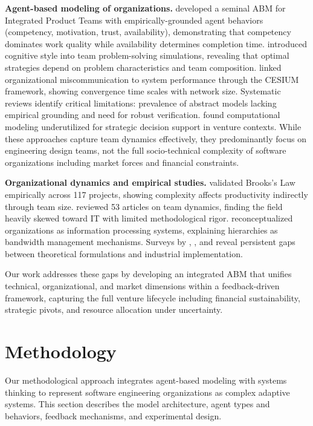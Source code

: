 \documentclass[alpha-refs]{wiley-article}
\begin{document}
\textbf{Agent-based modeling of organizations.} \citet{crowder2012development} developed a seminal ABM for Integrated Product Teams with empirically-grounded agent behaviors (competency, motivation, trust, availability), demonstrating that competency dominates work quality while availability determines completion time. \citet{lapp2019kaboom} introduced cognitive style into team problem-solving simulations, revealing that optimal strategies depend on problem characteristics and team composition. \citet{meluso2019agent, meluso2022review} linked organizational miscommunication to system performance through the CESIUM framework, showing convergence time scales with network size. Systematic reviews \cite{sandria2024agent, negahban2014agent} identify critical limitations: prevalence of abstract models lacking empirical grounding and need for robust verification. \citet{zali2014system} found computational modeling underutilized for strategic decision support in venture contexts. While these approaches capture team dynamics effectively, they predominantly focus on engineering design teams, not the full socio-technical complexity of software organizations including market forces and financial constraints.

\textbf{Organizational dynamics and empirical studies.} \citet{blackburn2006brooks} validated Brooks's Law empirically across 117 projects, showing complexity affects productivity indirectly through team size. \citet{hindiyeh2023systematic} reviewed 53 articles on team dynamics, finding the field heavily skewed toward IT with limited methodological rigor. \citet{petkov2008information} reconceptualized organizations as information processing systems, explaining hierarchies as bandwidth management mechanisms. Surveys by \citet{fan2004modeling}, \citet{wynn2018process}, and \citet{costa2020team} reveal persistent gaps between theoretical formulations and industrial implementation.

Our work addresses these gaps by developing an integrated ABM that unifies technical, organizational, and market dimensions within a feedback-driven framework, capturing the full venture lifecycle including financial sustainability, strategic pivots, and resource allocation under uncertainty.

\section{Methodology}

Our methodological approach integrates agent-based modeling with systems thinking to represent software engineering organizations as complex adaptive systems. This section describes the model architecture, agent types and behaviors, feedback mechanisms, and experimental design.
\end{document}
